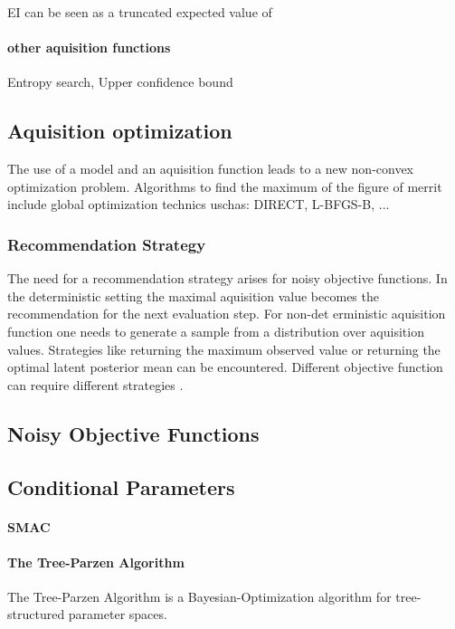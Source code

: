 \documentclass[english]{article}
\begin{document}
EI can be seen as a truncated expected value of

\paragraph{other aquisition functions}
Entropy search, Upper confidence bound

\subsection*{Aquisition optimization}
The use of a model and an aquisition function leads to a new non-convex optimization problem. Algorithms to find the maximum of the figure of merrit include global optimization technics uschas: DIRECT, L-BFGS-B, ...

\subsubsection*{Recommendation Strategy}
The need for a recommendation strategy arises for noisy objective functions. In the deterministic setting the maximal aquisition value becomes the recommendation for the next evaluation step. For non-det erministic aquisition function one needs to generate a sample from a distribution over aquisition values. Strategies like returning the maximum observed value or returning the optimal latent posterior mean can be encountered. Different objective function can require different strategies \cite{hoffman_modular_2014}.

\subsection{Noisy Objective Functions}

\subsection{Conditional Parameters}

\paragraph{SMAC}

\paragraph{The Tree-Parzen Algorithm}
The Tree-Parzen Algorithm \cite{bergstra_algorithms_2011} is a Bayesian-Optimization algorithm for tree-structured parameter spaces.
\end{document}
